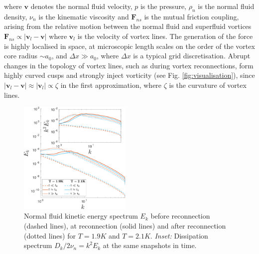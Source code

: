 \documentclass[%
 reprint,
 amsmath,amssymb,
 aps,
 prl,
]{revtex4-2}
\def \v{\mathbf{v}}
\begin{document}
where $\v$ denotes the normal fluid velocity, $p$ is the pressure, $\rho_n$ is the normal fluid density, $\nu_n$ is the kinematic viscosity and $\mathbf{F}_{ns}$ is the mutual friction coupling, arising from the relative motion between the normal fluid and superfluid vortices $\mathbf{F}_{ns}\propto \left|\v_{l}-\v\right|$ where $\v_l$ is the velocity of vortex lines. The generation of the force is highly localised in space, at microscopic length scales on the order of the vortex core radius $\sim a_0$, and $\Delta x \gg a_0$, where $\Delta x$ is a typical grid discretisation. Abrupt changes in the topology of vortex lines, such as during vortex reconnections, form highly curved cusps and strongly inject vorticity (see Fig. \ref{fig:visualisation}), since $|\v_l-\v|\approx|\v_l|\propto\zeta$ in the first approximation, where $\zeta$ is the curvature of vortex lines. 


\begin{figure}[b]
    \centering
    \includegraphics*[width=0.48\textwidth]{energy-spec.pdf}
    \caption{Normal fluid kinetic energy spectrum $E_k$ before reconnection (dashed lines), at reconnection (solid lines) and after reconnection (dotted lines) for $T=1.9K$ and $T=2.1K$. \emph{Inset:} Dissipation spectrum $D_k/2\nu_n=k^2 E_k$ at the same snapshots in time.}
    \label{fig:kinetic-energy}
\end{figure}
\end{document}
